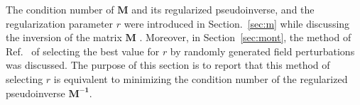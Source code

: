 

The condition number of $\bm{M}$ and its regularized pseudoinverse,
and the regularization parameter $r$ were introduced in
Section.~\ref{sec:m} while discussing the inversion of the matrix
$\bm{M}$ . Moreover, in Section~\ref{sec:mont}, the method of
Ref.~\cite{bea} of selecting the best value for $r$ by randomly
generated field perturbations was discussed.  The purpose of this
section is to report that this method of selecting $r$ is equivalent
to minimizing the condition number of the regularized pseudoinverse
$\bm{M^{-1}}$.

 

